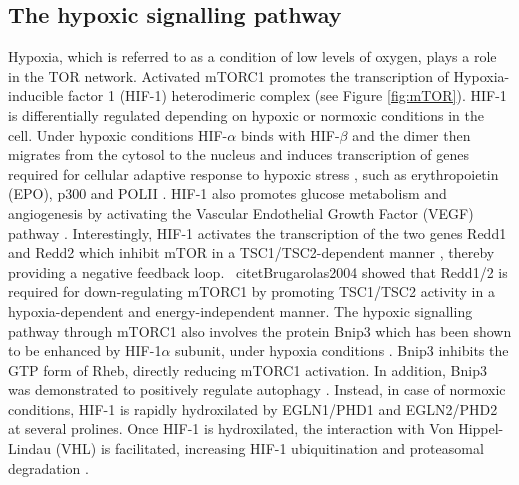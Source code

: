 \subsection{The hypoxic signalling pathway}
\label{subsec:The hypoxic signalling pathway}
Hypoxia, which is referred to as a condition of low levels of oxygen, plays a role in the TOR network. Activated mTORC1 promotes the transcription of Hypoxia-inducible factor 1 (HIF-1) heterodimeric complex (see Figure \ref{fig:mTOR}). HIF-1 is differentially regulated depending on hypoxic or normoxic conditions in the cell. Under hypoxic conditions HIF-$\alpha$ binds with HIF-$\beta$ and the dimer then migrates from the cytosol to the nucleus and induces transcription of genes required for cellular adaptive response to hypoxic stress \citep{Dery2005}, such as erythropoietin (EPO), p300 and POLII \citep{Maxwell2005}. HIF-1 also promotes glucose metabolism \citep{Huang2004, Ke2006} and angiogenesis by activating the Vascular Endothelial Growth Factor (VEGF) pathway \citep{Gray2005, Klimova2008}. Interestingly, HIF-1 activates the transcription of the two genes Redd1 and Redd2 which inhibit mTOR in a TSC1/TSC2-dependent manner \citep{McCarthy2004, Brugarolas2004}, thereby providing a negative feedback loop. \
citet{Brugarolas2004} showed that Redd1/2 is required for down-regulating mTORC1 by promoting TSC1/TSC2 activity in a hypoxia-dependent and energy-independent manner. The hypoxic signalling pathway through mTORC1 also involves the protein Bnip3 which has been shown to be enhanced by HIF-1$\alpha$ subunit, under hypoxia conditions \citep{Wouters2008}. Bnip3 inhibits the GTP form of Rheb, directly reducing mTORC1 activation. In addition, Bnip3 was demonstrated to positively regulate autophagy \citep{Bellot2009}. Instead, in case of normoxic conditions, HIF-1 is rapidly hydroxilated by EGLN1/PHD1 and EGLN2/PHD2 at several prolines. Once HIF-1 is hydroxilated, the interaction with Von Hippel-Lindau (VHL) is facilitated, increasing HIF-1 ubiquitination and proteasomal degradation \citep{Dery2005, Maxwell2005}. 

